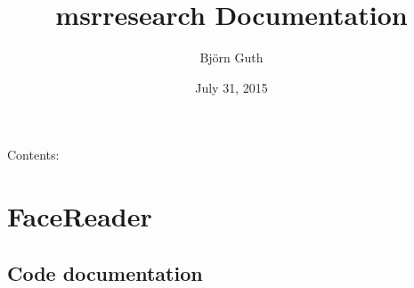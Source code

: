 \documentclass[letterpaper,10pt,english]{sphinxmanual}
\title{msrresearch Documentation}
\date{July 31, 2015}
\author{Björn Guth}
\begin{document}
\maketitle
\tableofcontents
{}\label{index::doc}


Contents:


\chapter{FaceReader}
\label{_static/facereader:welcome-to-facereader-client-s-documentation}\label{_static/facereader::doc}\label{_static/facereader:facereader}

\section{Code documentation}
\label{_static/facereader:code-documentation}
\end{document}
